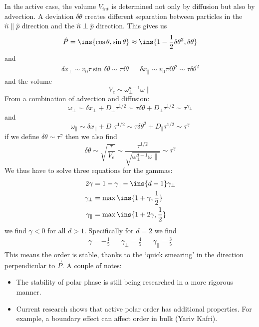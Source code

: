 In the active case, the volume \(V_{int}\) is determined not only by diffusion but also by advection. A deviation \(\delta\theta\) creates different separation between particles in the \(\hat n \parallel \hat p\) direction and the \(\hat n \perp \hat p\) direction. This gives us
\begin{equation}
    \hat P = \ins{\cos\theta,\sin\theta} \approx \ins{1-\frac{1}{2}\delta\theta^2,\delta\theta}
\end{equation}
and
\begin{align}
    \delta x_\perp \sim v_0\tau\sin\delta\theta \sim \tau\delta\theta && \delta x_\parallel \sim v_0\tau\delta\theta^2 \sim \tau\delta\theta^2
\end{align}
and the volume
\begin{equation}
    V_e \sim \omega_\perp^{d-1}\omega\parallel
\end{equation}
From a combination of advection and diffusion:
\begin{equation}
    \omega_\perp \sim \delta x_\perp + D_\perp\tau^{1/2} \sim \tau\delta\theta + D_\perp\tau^{1/2} \sim \tau^{\gamma_\perp}
\end{equation}
and
\begin{equation}
    \omega_\parallel \sim \delta x_\parallel + D_\parallel\tau^{1/2} \sim \tau\delta\theta^2+D_\parallel\tau^{1/2}\sim\tau^\gamma
\end{equation}
if we define \(\delta\theta\sim\tau^\gamma\) then we also find
\begin{equation}
    \delta\theta \sim \sqrt{\frac{\tau}{V_e}} \sim \frac{\tau^{1/2}}{\sqrt{\omega_\perp^{d-1}\omega\parallel}}\sim\tau^\gamma
\end{equation}
We thus have to solve three equations for the gammas:
\begin{align}
    2\gamma &= 1-\gamma_\parallel-\ins{d-1}\gamma_\perp \\
    \gamma_\perp &= \max\ins{1+\gamma,\frac{1}{2}} \\
    \gamma_\parallel &= \max\ins{1+2\gamma,\frac{1}{2}}
\end{align}
we find \(\gamma < 0\) for all \(d>1\). Specifically for \(d=2\) we find
\begin{align}
    \gamma = -\frac{1}{5} && \gamma_\perp = \frac{4}{5} && \gamma_\parallel = \frac{3}{5}
\end{align}
This means the order is stable, thanks to the `quick smearing' in the direction perpendicular to \(\vec{P}\). A couple of notes:
\begin{itemize}
    \item The stability of polar phase is still being researched in a more rigorous manner.
    \item Current research shows that active polar order has additional properties. For example, a boundary effect can affect order in bulk (Yariv Kafri).
\end{itemize}
